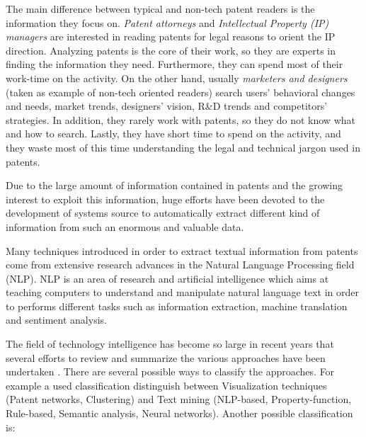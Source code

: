 \documentclass[]{book}
\theoremstyle{definition}
\theoremstyle{definition}
\theoremstyle{definition}
\theoremstyle{remark}
\begin{document}
The main difference between typical and non-tech patent readers is the
information they focus on. \emph{Patent attorneys} and
\emph{Intellectual Property (IP) managers} are interested in reading
patents for legal reasons to orient the IP direction. Analyzing patents
is the core of their work, so they are experts in finding the
information they need. Furthermore, they can spend most of their
work-time on the activity. On the other hand, usually \emph{marketers
and designers} (taken as example of non-tech oriented readers) search
users' behavioral changes and needs, market trends, designers' vision,
R\&D trends and competitors' strategies. In addition, they rarely work
with patents, so they do not know what and how to search. Lastly, they
have short time to spend on the activity, and they waste most of this
time understanding the legal and technical jargon used in patents.

Due to the large amount of information contained in patents and the
growing interest to exploit this information, huge efforts have been
devoted to the development of systems source to automatically extract
different kind of information from such an enormous and valuable data.

Many techniques introduced in order to extract textual information from
patents come from extensive research advances in the Natural Language
Processing field (NLP). NLP is an area of research and artificial
intelligence which aims at teaching computers to understand and
manipulate natural language text in order to performs different tasks
such as information extraction, machine translation and sentiment
analysis.

The field of technology intelligence has become so large in recent years
that several efforts to review and summarize the various approaches have
been undertaken \citep{abbas2014literature}. There are several possible
ways to classify the approaches. For example a used classification
distinguish between Visualization techniques (Patent networks,
Clustering) and Text mining (NLP-based, Property-function, Rule-based,
Semantic analysis, Neural networks). Another possible classification is:
\end{document}
